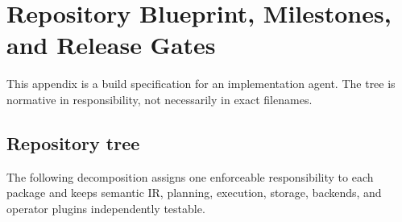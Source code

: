 \section{Repository Blueprint, Milestones, and Release Gates}
\label{app:repository}

This appendix is a build specification for an implementation agent. The tree is normative in responsibility, not necessarily in exact filenames.

\subsection{Repository tree}

The following decomposition assigns one enforceable responsibility to each package and keeps semantic IR, planning, execution, storage, backends, and operator plugins independently testable.

